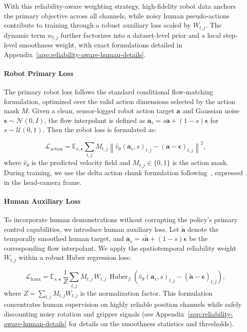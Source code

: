 \documentclass{article}
\begin{document}
With this reliability-aware weighting strategy, high-fidelity robot data anchors the primary objective across all channels, while noisy human pseudo-actions contribute to training through a robust auxiliary loss scaled by \(W_{t,j}\). The dynamic term \(w_{t,j}\) further factorizes into a dataset-level prior and a local step-level smoothness weight, with exact formulations detailed in Appendix~\ref{app:reliability-aware-human-details}.

\paragraph{Robot Primary Loss}

The primary robot loss follows the standard conditional flow-matching formulation, optimized over the valid action dimensions selected by the action mask $M$. Given a clean, sensor-logged robot action target $\mathbf{a}$ and Gaussian noise $\boldsymbol{\epsilon} \sim \mathcal{N}(0, I)$, the flow interpolant is defined as $\mathbf{a}_s = s\mathbf{a} + (1{-}s)\boldsymbol{\epsilon}$ for $s \sim \mathcal{U}(0,1)$. Then the robot loss is formulated as:


\begin{equation}
\label{equ:action_loss}
\mathcal{L}_{\mathrm{action}}
=
\mathbb{E}_{s,\boldsymbol{\epsilon}}
\sum_{t,j}
M_{t,j}
\left\|
\hat{v}_\theta(\mathbf{a}_s, s)_{t,j}
-
(\mathbf{a} - \boldsymbol{\epsilon})_{t,j}
\right\|^2,
\end{equation}
where $\hat{v}_\theta$ is the predicted velocity field and $M_{t,j} \in \{0,1\}$ is the action mask. During training, we use the delta action chunk formulation following~\cite{BlackK-RSS-25}, expressed in the head-camera frame.



\paragraph{Human Auxiliary Loss}
\label{sec:human-auxiliary-loss}

To incorporate human demonstrations without corrupting the policy's primary control capabilities, we introduce human auxiliary loss. Let $\tilde{\mathbf{a}}$ denote the temporally smoothed human target, and $\mathbf{a}_s = s\tilde{\mathbf{a}} + (1{-}s)\boldsymbol{\epsilon}$ be the corresponding flow interpolant. We apply the spatiotemporal reliability weight $W_{t,j}$ within a robust Huber regression loss:

\begin{equation}
  \mathcal{L}_{\mathrm{haux}}
  =
  \mathbb{E}_{s,\boldsymbol{\epsilon}}\,
  \frac{1}{Z}
  \sum_{t,j}
  M_{t,j}\,
  W_{t,j}\,
  \operatorname{Huber}_{\beta}\!\left(
  \hat{v}_\theta(\mathbf{a}_s, s)_{t,j}
  -
  (\tilde{\mathbf{a}} - \boldsymbol{\epsilon})_{t,j}
  \right),
\end{equation}
where $Z = \sum_{t,j} M_{t,j} W_{t,j}$ is the normalization factor. This formulation concentrates human supervision on highly reliable position channels while safely discounting noisy rotation and gripper signals (see Appendix~\ref{app:reliability-aware-human-details} for details on the smoothness statistics and thresholds).
\end{document}
